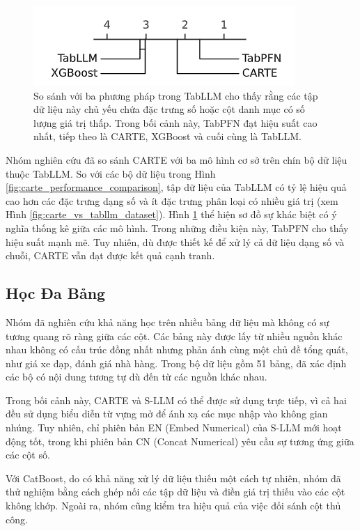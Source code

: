 \documentclass{article}
\begin{document}
\begin{figure} 
    \centering
    \includegraphics[scale = 0.8]{carte_baseline_comparision.png}
    \caption{So sánh với ba phương pháp trong TabLLM cho thấy rằng các tập dữ liệu này chủ yếu chứa đặc trưng số hoặc cột danh mục có số lượng giá trị thấp. Trong bối cảnh này, TabPFN đạt hiệu suất cao nhất, tiếp theo là CARTE, XGBoost và cuối cùng là TabLLM.}
    \label{fig:carte_baseline_comparision}
\end{figure}

Nhóm nghiên cứu đã so sánh CARTE với ba mô hình cơ sở trên chín bộ dữ liệu thuộc TabLLM. So với các bộ dữ liệu trong Hình \ref{fig:carte_performance_comparison}, tập dữ liệu của TabLLM có tỷ lệ hiệu quả cao hơn các đặc trưng dạng số và ít đặc trưng phân loại có nhiều giá trị (xem Hình \ref{fig:carte_vs_tabllm_dataset}). Hình \ref{fig:carte_baseline_comparision} thể hiện sơ đồ sự khác biệt có ý nghĩa thống kê giữa các mô hình. Trong những điều kiện này, TabPFN cho thấy hiệu suất mạnh mẽ. Tuy nhiên, dù được thiết kế để xử lý cả dữ liệu dạng số và chuỗi, CARTE vẫn đạt được kết quả cạnh tranh.

\subsection{Học Đa Bảng}
Nhóm đã nghiên cứu khả năng học trên nhiều bảng dữ liệu mà không có sự tương quang rõ ràng giữa các cột. Các bảng này được lấy từ nhiều nguồn khác nhau không có cấu trúc đồng nhất nhưng phản ánh cùng một chủ đề tổng quát, như giá xe đạp, đánh giá nhà hàng. Trong bộ dữ liệu gồm 51 bảng, đã xác định các bộ có nội dung tương tự dù đến từ các nguồn khác nhau.

Trong bối cảnh này, CARTE và S-LLM có thể được sử dụng trực tiếp, vì cả hai đều sử dụng biểu diễn từ vựng mở để ánh xạ các mục nhập vào không gian nhúng. Tuy nhiên, chỉ phiên bản EN (Embed Numerical) của S-LLM mới hoạt động tốt, trong khi phiên bản CN (Concat Numerical) yêu cầu sự tương ứng giữa các cột số.

Với CatBoost, do có khả năng xử lý dữ liệu thiếu một cách tự nhiên, nhóm đã thử nghiệm bằng cách ghép nối các tập dữ liệu và điền giá trị thiếu vào các cột không khớp. Ngoài ra, nhóm cũng kiểm tra hiệu quả của việc đối sánh cột thủ công.
\end{document}
